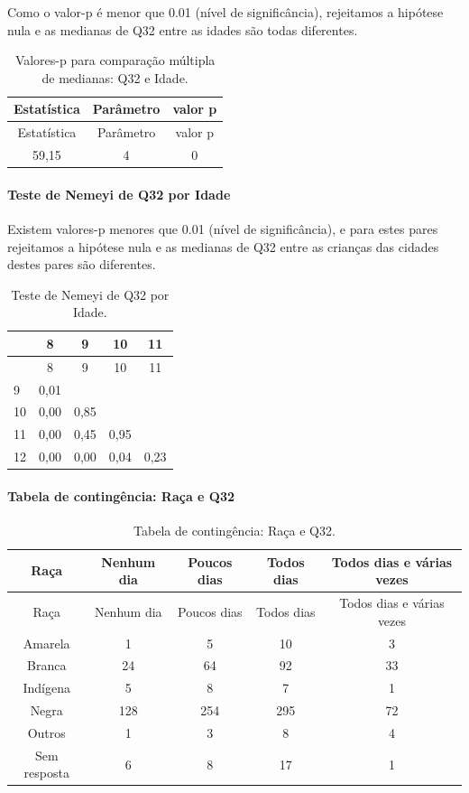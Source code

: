 \documentclass[]{article}
\let\oldparagraph\paragraph
\renewcommand{\paragraph}[1]{\oldparagraph{#1}\mbox{}}
\begin{document}
Como o valor-p é menor que 0.01 (nível de significância), rejeitamos a hipótese nula e as medianas de Q32 entre as idades são todas diferentes.

\begin{longtable}[]{@{}ccc@{}}
\caption{\label{tab:unnamed-chunk-1101}Valores-p para comparação múltipla de medianas: Q32 e Idade.}\tabularnewline
\toprule
Estatística & Parâmetro & valor p\tabularnewline
\midrule
\endfirsthead
\toprule
Estatística & Parâmetro & valor p\tabularnewline
\midrule
\endhead
59,15 & 4 & 0\tabularnewline
\bottomrule
\end{longtable}

\hypertarget{teste-de-nemeyi-de-q32-por-idade}{%
\paragraph{Teste de Nemeyi de Q32 por Idade}\label{teste-de-nemeyi-de-q32-por-idade}}

Existem valores-p menores que 0.01 (nível de significância), e para estes pares rejeitamos a hipótese nula e as medianas de Q32 entre as crianças das cidades destes pares são diferentes.

\begin{longtable}[]{@{}lcccc@{}}
\caption{\label{tab:unnamed-chunk-1103}Teste de Nemeyi de Q32 por Idade.}\tabularnewline
\toprule
& 8 & 9 & 10 & 11\tabularnewline
\midrule
\endfirsthead
\toprule
& 8 & 9 & 10 & 11\tabularnewline
\midrule
\endhead
9 & 0,01 & & &\tabularnewline
10 & 0,00 & 0,85 & &\tabularnewline
11 & 0,00 & 0,45 & 0,95 &\tabularnewline
12 & 0,00 & 0,00 & 0,04 & 0,23\tabularnewline
\bottomrule
\end{longtable}

\cleardoublepage

\hypertarget{tabela-de-continguxeancia-rauxe7a-e-q32}{%
\paragraph{Tabela de contingência: Raça e Q32}\label{tabela-de-continguxeancia-rauxe7a-e-q32}}

\begin{longtable}[]{@{}ccccc@{}}
\caption{\label{tab:unnamed-chunk-1104}Tabela de contingência: Raça e Q32.}\tabularnewline
\toprule
Raça & Nenhum dia & Poucos dias & Todos dias & Todos dias e várias vezes\tabularnewline
\midrule
\endfirsthead
\toprule
Raça & Nenhum dia & Poucos dias & Todos dias & Todos dias e várias vezes\tabularnewline
\midrule
\endhead
Amarela & 1 & 5 & 10 & 3\tabularnewline
Branca & 24 & 64 & 92 & 33\tabularnewline
Indígena & 5 & 8 & 7 & 1\tabularnewline
Negra & 128 & 254 & 295 & 72\tabularnewline
Outros & 1 & 3 & 8 & 4\tabularnewline
Sem resposta & 6 & 8 & 17 & 1\tabularnewline
\bottomrule
\end{longtable}
\end{document}
